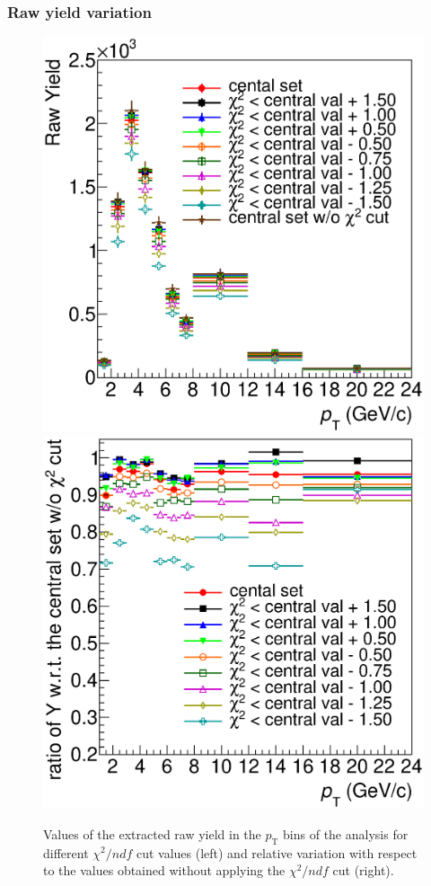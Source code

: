 \documentclass[b5paper,10pt,twoside,oldstyle,classica]{toptesi}
\newcommand{\pt}{p_\text{T}}
\begin{document}
\subsubsection{Raw yield variation}
\begin{figure}[tb]
\begin{center}
{\includegraphics[scale = 0.31]{KF_CutVarSyst_rawyield_chiS.eps}}
\hspace{-0.5cm}
{\includegraphics[scale = 0.31]{KF_CutVarSyst_ratioraw_chiS.eps}}
\caption{Values of the extracted raw yield in the $\pt$ bins of the analysis for different $\chi^2/ndf$ cut values (left) and relative variation with respect to the values obtained without applying the $\chi^2/ndf$ cut (right).}
\label{KF_chivar_raw}
\end{center}
\end{figure}
\end{document}
